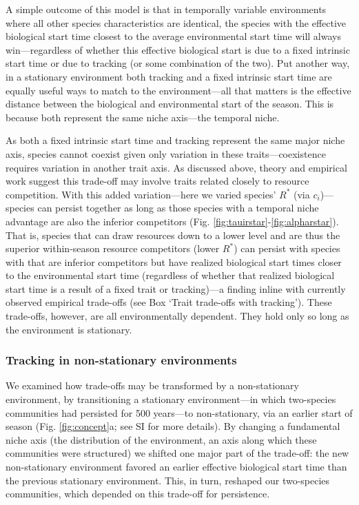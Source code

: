 \documentclass[11pt,letterpaper]{article}
\begin{document}
A simple outcome of this model is that in temporally variable environments where all other species characteristics are identical, the species with the effective biological start time closest to the average environmental start time will always win---regardless of whether this effective biological start is due to a fixed intrinsic start time or due to tracking (or some combination of the two). Put another way, in a stationary environment both tracking and a fixed intrinsic start time are equally useful ways to match to the environment---all that matters is the effective distance between the biological and environmental start of the season. This is because both represent the same niche axis---the temporal niche. 

As both a fixed intrinsic start time and tracking represent the same major niche axis, species cannot coexist given only variation in these traits---coexistence requires variation in another trait axis. As discussed above, theory and empirical work suggest this trade-off may involve traits related closely to resource competition. With this added variation---here we varied species' $R^*$ (via $c_i$)---species can persist together as long as those species with a temporal niche advantage are also the inferior competitors (Fig. \ref{fig:tauirstar}-\ref{fig:alpharstar}). That is, species that can draw resources down to a lower level and are thus the superior within-season resource competitors (lower $R^*$) can persist with species with that are inferior competitors but have realized biological start times closer to the environmental start time (regardless of whether that realized biological start time is a result of a fixed trait or tracking)---a finding inline with currently observed empirical trade-offs (see Box `Trait trade-offs with tracking'). These trade-offs, however, are all environmentally dependent. They hold only so long as the environment is stationary. 

\subsubsection{Tracking in non-stationary environments}
We examined how trade-offs may be transformed by a non-stationary environment, by transitioning a stationary environment---in which two-species communities had persisted for 500 years---to non-stationary, via an earlier start of season (Fig. \ref {fig:concept}a; see SI for more details). By changing a fundamental niche axis (the distribution of the environment, an axis along which these communities were structured) we shifted one major part of the trade-off: the new non-stationary environment favored an earlier effective biological start time than the previous stationary environment. This, in turn, reshaped our two-species communities, which depended on this trade-off for persistence. %
\end{document}

